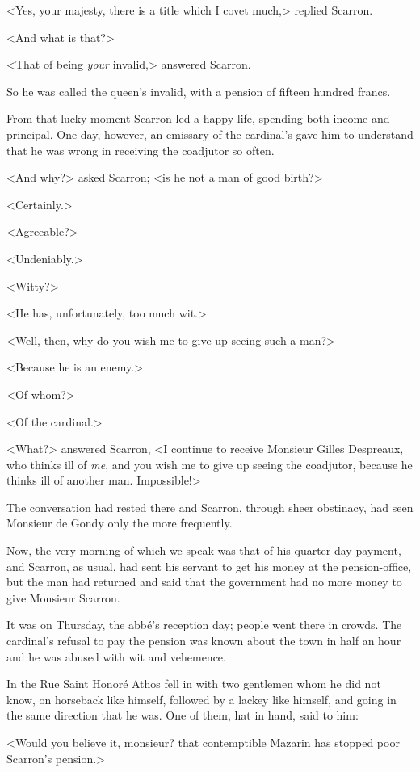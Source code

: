 <Yes, your majesty, there is a title which I covet much,> replied Scarron.

<And what is that?>

<That of being \textit{your} invalid,> answered Scarron.

So he was called the queen's invalid, with a pension of fifteen hundred francs.

From that lucky moment Scarron led a happy life, spending both income and principal. One day, however, an emissary of the cardinal's gave him to understand that he was wrong in receiving the coadjutor so often.

<And why?> asked Scarron; <is he not a man of good birth?>

<Certainly.>

<Agreeable?>

<Undeniably.>

<Witty?>

<He has, unfortunately, too much wit.>

<Well, then, why do you wish me to give up seeing such a man?>

<Because he is an enemy.>

<Of whom?>

<Of the cardinal.>

<What?> answered Scarron, <I continue to receive Monsieur Gilles Despreaux, who thinks ill of \textit{me}, and you wish me to give up seeing the coadjutor, because he thinks ill of another man. Impossible!>

The conversation had rested there and Scarron, through sheer obstinacy, had seen Monsieur de Gondy only the more frequently.

Now, the very morning of which we speak was that of his quarter-day payment, and Scarron, as usual, had sent his servant to get his money at the pension-office, but the man had returned and said that the government had no more money to give Monsieur Scarron.

It was on Thursday, the abbé's reception day; people went there in crowds. The cardinal's refusal to pay the pension was known about the town in half an hour and he was abused with wit and vehemence.

In the Rue Saint Honoré Athos fell in with two gentlemen whom he did not know, on horseback like himself, followed by a lackey like himself, and going in the same direction that he was. One of them, hat in hand, said to him:

<Would you believe it, monsieur? that contemptible Mazarin has stopped poor Scarron's pension.>

